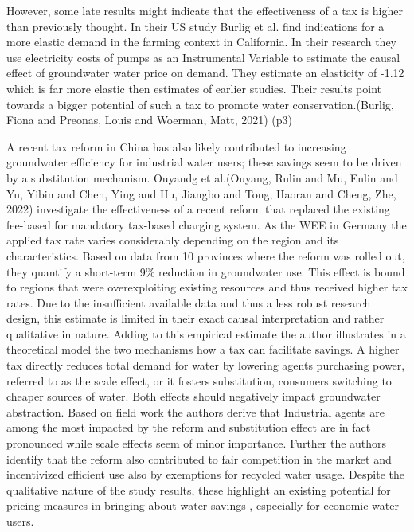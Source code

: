 \documentclass[11pt]{article}
\begin{document}
However, some late results might indicate that the effectiveness of a tax is higher than previously thought. In their US study Burlig et al. find indications for a more elastic demand in the farming context in California. In their research they use electricity costs of pumps as an Instrumental Variable to estimate the causal effect of groundwater water price on demand. They estimate an elasticity of -1.12 which is far more elastic then estimates of earlier studies. Their results point towards a bigger potential of such a tax to promote water conservation.(Burlig, Fiona and Preonas, Louis and Woerman, Matt, 2021) (p3)

A recent tax reform in China has also likely contributed to increasing groundwater efficiency for industrial water users; these savings seem to be driven by a substitution mechanism. 
Ouyandg et al.(Ouyang, Rulin and Mu, Enlin and Yu, Yibin and Chen, Ying and Hu, Jiangbo and Tong, Haoran and Cheng, Zhe, 2022) investigate the effectiveness of a recent reform that replaced the existing fee-based for mandatory tax-based charging system. As the WEE in Germany the applied tax rate varies considerably depending on the region and its characteristics. Based on data from 10 provinces where the reform was rolled out, they quantify a short-term 9\% reduction in groundwater use. This effect is bound to regions that were overexploiting existing resources and thus received higher tax rates.  Due to the insufficient available data and thus a less robust research design, this estimate is limited in their exact causal interpretation and rather qualitative in nature. 
Adding to this empirical estimate the author illustrates in a theoretical model the two mechanisms how a tax can facilitate savings. A higher tax directly reduces total demand for water by lowering agents purchasing power, referred to as the scale effect, or it fosters substitution, consumers switching to cheaper sources of water. Both effects should negatively impact groundwater abstraction. Based on field work the authors derive that Industrial agents are among the most impacted by the reform and substitution effect are in fact pronounced while scale effects seem of minor importance. Further the authors identify that the reform also contributed to fair competition in the market and incentivized efficient use also by exemptions for recycled water usage. Despite the qualitative nature of the study results, these highlight an existing potential for pricing measures in bringing about water savings , especially for economic water users.
\end{document}
